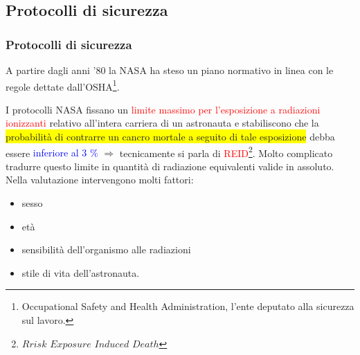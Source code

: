 \documentclass[9pt]{beamer}
\begin{document}
\subsection{Protocolli di sicurezza}
\begin{frame} [fragile]
	\frametitle{Protocolli di sicurezza}
 A partire dagli anni '80 la NASA ha steso un piano normativo in linea con le regole dettate dall'OSHA\footnote{Occupational Safety and Health Administration, l'ente deputato alla sicurezza sul lavoro.}.
 \newline
 
 I protocolli NASA fissano un \textcolor{red}{limite massimo per l'esposizione a radiazioni ionizzanti} relativo all'intera carriera di un astronauta e stabiliscono che la \colorbox{yellow}{probabilit\`a di contrarre un cancro mortale a seguito di tale esposizione} debba essere \textcolor{blue}{inferiore al 3 $\%$} 
$\Longrightarrow$ tecnicamente si parla di \textcolor{red}{REID}\footnote{$Rrisk$ $Exposure$ $Induced$ $Death$}.	
\newline
Molto complicato tradurre questo limite in quantit\`a di radiazione equivalenti valide in assoluto. Nella valutazione intervengono molti fattori:
\begin{itemize}
\item sesso
\item et\`a
\item sensibilit\`a dell'organismo alle radiazioni 
\item stile di vita dell'astronauta.
\end{itemize} 

  \end{frame}
  
\end{document}
